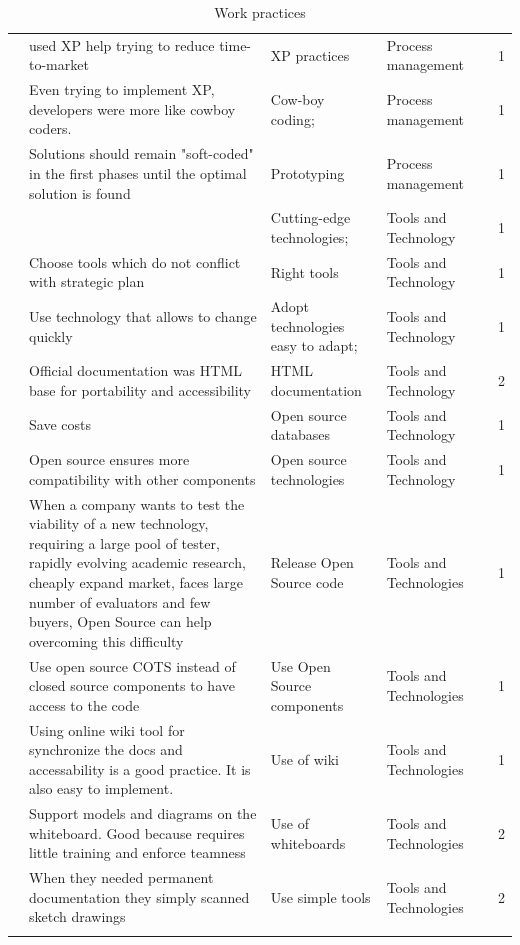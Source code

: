 \documentclass[final,5p,times,twocolumn]{elsarticle}
\begin{document}
\begin{center}
\begin{longtable}{|p{0.36in}|p{2.6in}|p{1.2in}|p{0.9in}|p{0.9in}|p{0.2in}|}
\cite{Silva2005} & used XP help trying to reduce time-to-market & XP practices & Process management &       & 1 \\
\cite{Silva2005} & Even trying to implement XP, developers were more like cowboy coders. & Cow-boy coding; & Process management &       & 1 \\
\cite{Deakins2005} & Solutions should remain "soft-coded" in the first phases until the optimal solution is found & Prototyping & Process management &       & 1 \\
\cite{Silva2005} &       & Cutting-edge technologies; & Tools and Technology &       & 1 \\
\cite{Crowne2002} & Choose tools which do not conflict with strategic plan & Right tools & Tools and Technology &       & 1 \\
\cite{Sutton2000} & Use technology that allows to change quickly & Adopt technologies easy to adapt; & Tools and Technology &       & 1 \\
\cite{Ambler2002} & Official documentation was HTML base for portability and accessibility & HTML documentation & Tools and Technology &       & 2 \\
\cite{Wall2001} & Save costs & Open source databases & Tools and Technology &       & 1 \\
\cite{Wall2001} & Open source ensures more compatibility with other components & Open source technologies & Tools and Technology &       & 1 \\
\cite{Wood2005} & When a company wants to test the viability of a new technology, requiring a large pool of tester, rapidly evolving academic research, cheaply expand market, faces large number of evaluators and few buyers, Open Source can help overcoming this difficulty & Release Open Source code & Tools and Technologies &       & 1 \\
\cite{Wood2005} & Use open source COTS  instead of closed source components to have access to the code   & Use Open Source components & Tools and Technologies &       & 1 \\
\cite{Bean2005} & Using online wiki tool for synchronize the docs and accessability is a good practice. It is also easy to implement. & Use of wiki & Tools and Technologies &       & 1 \\
\cite{Ambler2002} & Support models and diagrams on the whiteboard. Good because requires little training and enforce teamness & Use of whiteboards & Tools and Technologies &       & 2 \\
\cite{Ambler2002} & When they needed permanent documentation they simply scanned sketch drawings & Use simple tools & Tools and Technologies &       & 2 \\



\hline
\caption{Work practices}\label{tab:appendix:workpract}\\
\end{longtable}
\end{center}




\twocolumn





\end{document}

